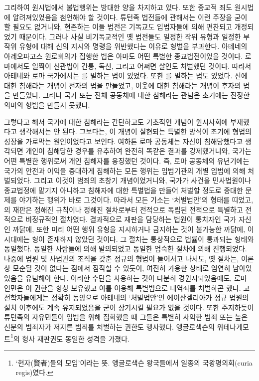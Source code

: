 그리하여 원시법에서 불법행위는 방대한 양을 차지하고 있다.
또한 종교적 죄도 원시법에 알려져있었음을 첨언해야 할 것이다.
튜턴족 법전들에 관해서는 이런 주장을 굳이 할 필요도 없거니와,
현존하는 이들 법전은 기독교도 입법자들에 의해
편찬되고 개정되었기 때문이다.
그러나 사실 비기독교적인 옛 법전들도
일정한 작위 유형과 일정한 부작위 유형에 대해
신의 지시와 명령을 위반했다는 이유로 형벌을 부과한다.
아테네의 아레오파고스 원로회의가 집행한 법은
아마도 어떤 특별한 종교법전이었을 것이다.
로마에서도 일찍이
신관법이
간통, 독신, 그리고 어쩌면 살인도
처벌했던 것이다.
따라서 아테네와 로마 국가에서는 를 벌하는 법이 있었다.
또한 를 벌하는 법도 있었다.
신에 대한 침해라는 개념이 전자의 법을 만들었고,
이웃에 대한 침해라는 개념이 후자의 법을 만들었다.
그러나 국가 또는 전체 공동체에 대한 침해라는 관념은
초기에는 진정한 의미의 형법을 만들지 못했다.

그렇다고 해서
국가에 대한 침해라는 간단하고도 기초적인 개념이 원시사회에
부재했다고 생각해서는 안 된다.
그보다는,
이 개념이 실현되는 특별한 방식이
초기에 형법의 성장을 가로막는 원인이었다고 보인다.
여하튼
로마 공동체는 자신이 침해당했다고 생각되면
개인이 침해당한 경우를 유추하여
완전히 똑같은 결과를 강제했거니와,
국가는 어떤 특별한 행위로써 개인 침해자를 응징했던 것이다.
즉, 로마 공동체의 유년기에는
국가의 안전과 이익을 중대하게 침해하는 모든 행위는
입법기관의 개별 입법에 의해 처벌되었다.
그리고 이것이 범죄의 초창기 개념이었거니와,
국가가 사건을 민사법원이나 종교법정에 맡기지 아니하고
침해자에 대한 특별법을 만들어 처벌할 정도로
중대한 문제를 야기하는 행위가
바로 그것이다.
따라서 모든 기소는
`처벌법안'의
형태를 띠었고,
의 재판은
정해진 규칙이나 정해진 절차로부터 전적으로 독립된
전적으로 특별하고 전적으로 비정규적인 절차였다.
결과적으로
재판을 담당하는 법원이 통치자인 국가 자신인 까닭에,
또한
미리 어떤 행위 유형을 지시하거나 금지하는 것이 불가능한 까닭에,
이 시대에는 형이 존재하지 않았던 것이다.
그 절차는 통상적으로 법률이 통과되는 형태와 동일했다.
동일한 사람들에 의해 발의되었고
동일한 엄숙한 절차에 의해 진행되었다.
나중에 법원 및 사법관의 조직을 갖춘 정규의 형법이
들어서고 나서도,
옛 절차는,
이론상 모순될 것이 없다는 점에서 짐작할 수 있듯이,
여전히
가용한 상태로
엄연히
남아있었음을 유념해야 한다.
이러한 수단을 사용하는 것이 다분히 경원시되었음에도,
로마 인민은
이 권한을 항상 보유했고 이를 이용해
특별법으로 대역죄를 처벌하곤 했다.
고전학자들에게는
정확히 동양으로
아테네의 `처벌법안'인
에이산겔리아가
정규 법원의 설치 이후에도 계속 유지되었음을 굳이 상기시킬 필요가 없을 것이다.
또한
주지하듯이
튜턴족의 자유민들이 입법을 위해 집회했을 때
그들은
특별히 사악한 범죄
또는
높은 신분의 범죄자가 저지른 범죄를 처벌하는 권한도 행사했다.
앵글로색슨의 위테나게모트\footnote{%
  `현자(賢者)들의 모임'이라는 뜻. 앵글로색슨 왕국들에서
  일종의 국왕평의회(curia regis)였다.
}의 형사 재판권도
동일한 성격을 가졌다.

